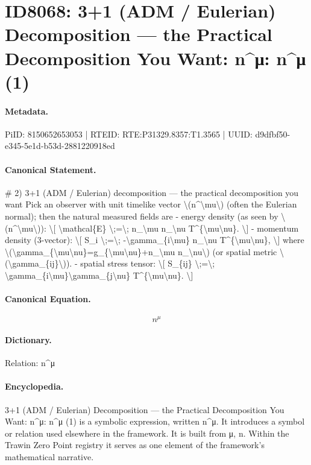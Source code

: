 \section*{ID8068: 3+1 (ADM / Eulerian) Decomposition — the Practical Decomposition You Want: n\textasciicircum{}μ: n\textasciicircum{}μ (1)}
\paragraph{Metadata.}
PiID: 8150652653053 | RTEID: RTE:P31329.8357:T1.3565 | UUID: d9dfbf50-e345-5e1d-b53d-2881220918ed

\paragraph{Canonical Statement.}
\# 2) 3+1 (ADM / Eulerian) decomposition — the practical decomposition you want Pick an observer with unit timelike vector \textbackslash{}(n\textasciicircum{}\textbackslash{}mu\textbackslash{}) (often the Eulerian normal); then the natural measured fields are - energy density (as seen by \textbackslash{}(n\textasciicircum{}\textbackslash{}mu\textbackslash{})): \textbackslash{}[ \textbackslash{}mathcal\{E\} \textbackslash{};=\textbackslash{}; n\_\textbackslash{}mu n\_\textbackslash{}nu T\textasciicircum{}\{\textbackslash{}mu\textbackslash{}nu\}. \textbackslash{}] - momentum density (3-vector): \textbackslash{}[ S\_i \textbackslash{};=\textbackslash{}; -\textbackslash{}gamma\_\{i\textbackslash{}mu\} n\_\textbackslash{}nu T\textasciicircum{}\{\textbackslash{}mu\textbackslash{}nu\}, \textbackslash{}] where \textbackslash{}(\textbackslash{}gamma\_\{\textbackslash{}mu\textbackslash{}nu\}=g\_\{\textbackslash{}mu\textbackslash{}nu\}+n\_\textbackslash{}mu n\_\textbackslash{}nu\textbackslash{}) (or spatial metric \textbackslash{}(\textbackslash{}gamma\_\{ij\}\textbackslash{})). - spatial stress tensor: \textbackslash{}[ S\_\{ij\} \textbackslash{};=\textbackslash{}; \textbackslash{}gamma\_\{i\textbackslash{}mu\}\textbackslash{}gamma\_\{j\textbackslash{}nu\} T\textasciicircum{}\{\textbackslash{}mu\textbackslash{}nu\}. \textbackslash{}]

\paragraph{Canonical Equation.}
\[
n^\mu
\]

\paragraph{Dictionary.}
Relation: n\textasciicircum{}μ

\paragraph{Encyclopedia.}
3+1 (ADM / Eulerian) Decomposition — the Practical Decomposition You Want: n\textasciicircum{}μ: n\textasciicircum{}μ (1) is a symbolic expression, written n\textasciicircum{}μ. It introduces a symbol or relation used elsewhere in the framework. It is built from μ, n. Within the Trawin Zero Point registry it serves as one element of the framework's mathematical narrative.
